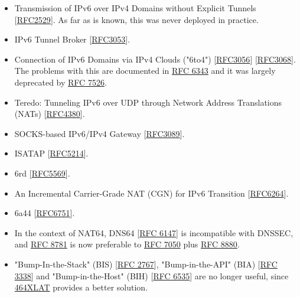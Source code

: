 \documentclass[
]{article}
\begin{document}
\begin{itemize}
\item
  Transmission of IPv6 over IPv4 Domains without Explicit Tunnels
  {[}\href{https://www.rfc-editor.org/info/rfc2529}{RFC2529}{]}. As far
  as is known, this was never deployed in practice.
\item
  IPv6 Tunnel Broker
  {[}\href{https://www.rfc-editor.org/info/rfc3053}{RFC3053}{]}.
\item
  Connection of IPv6 Domains via IPv4 Clouds ("6to4")
  {[}\href{https://www.rfc-editor.org/info/rfc3056}{RFC3056}{]}
  {[}\href{https://www.rfc-editor.org/info/rfc3068}{RFC3068}{]}. The
  problems with this are documented in
  \href{https://www.rfc-editor.org/info/rfc6343}{RFC 6343} and it was
  largely deprecated by
  \href{https://www.rfc-editor.org/info/rfc7526}{RFC 7526}.
\item
  Teredo: Tunneling IPv6 over UDP through Network Address Translations
  (NATs) {[}\href{https://www.rfc-editor.org/info/rfc4380}{RFC4380}{]}.
\item
  SOCKS-based IPv6/IPv4 Gateway
  {[}\href{https://www.rfc-editor.org/info/rfc3089}{RFC3089}{]}.
\item
  ISATAP {[}\href{https://www.rfc-editor.org/info/rfc5214}{RFC5214}{]}.
\item
  6rd {[}\href{https://www.rfc-editor.org/info/rfc5569}{RFC5569}{]}.
\item
  An Incremental Carrier-Grade NAT (CGN) for IPv6 Transition
  {[}\href{https://www.rfc-editor.org/info/rfc6264}{RFC6264}{]}.
\item
  6a44 {[}\href{https://www.rfc-editor.org/info/rfc6751}{RFC6751}{]}.
\item
  In the context of NAT64, DNS64
  {[}\href{https://www.rfc-editor.org/info/rfc6147}{RFC 6147}{]} is
  incompatible with DNSSEC, and
  \href{https://www.rfc-editor.org/info/rfc8781}{RFC 8781} is now
  preferable to \href{https://www.rfc-editor.org/info/rfc7050}{RFC 7050}
  plus \href{https://www.rfc-editor.org/info/rfc8880}{RFC 8880}.
\item
  "Bump-In-the-Stack" (BIS)
  {[}\href{https://www.rfc-editor.org/info/rfc2767}{RFC 2767}{]},
  "Bump-in-the-API" (BIA)
  {[}\href{https://www.rfc-editor.org/info/rfc3338}{RFC 3338}{]} and
  "Bump-in-the-Host" (BIH)
  {[}\href{https://www.rfc-editor.org/info/rfc6535}{RFC 6535}{]} are no
  longer useful, since
  \hyperref[translation-and-ipv4-as-a-service]{464XLAT} provides a
  better solution.
\end{itemize}
\end{document}
